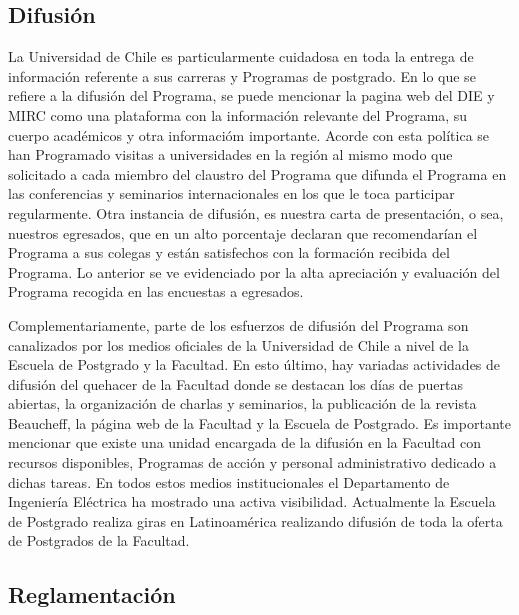\subsection{Difusión}

La Universidad de Chile es particularmente cuidadosa en toda la entrega de información referente
a sus carreras y Programas de postgrado. En lo que se refiere a la difusión del Programa, se puede
mencionar la pagina web del DIE y MIRC como una plataforma con la información relevante del
Programa, su cuerpo académicos y otra informacióm importante. 
Acorde con esta política se han Programado visitas a universidades en la región al mismo modo que
solicitado a cada miembro del claustro del Programa que difunda el Programa en las conferencias y
seminarios internacionales en los que le toca participar regularmente. Otra instancia de difusión, es nuestra 
carta de presentación, o sea, nuestros egresados, que en un alto porcentaje declaran que recomendarían
el Programa a sus colegas y están satisfechos con la formación recibida del Programa.
Lo anterior se ve evidenciado por la alta apreciación y evaluación del Programa recogida en las
encuestas a egresados. %

Complementariamente, parte de los esfuerzos de difusión del Programa son canalizados por
los medios oficiales de la Universidad de Chile a nivel de la Escuela de Postgrado y la Facultad.
En esto último, hay variadas actividades de difusión del quehacer de la Facultad donde se destacan
los días de puertas abiertas, la organización de charlas y seminarios, la publicación de la revista
Beaucheff, la página web de la Facultad y la Escuela de Postgrado. Es importante mencionar que
existe una unidad encargada de la difusión en la Facultad con recursos disponibles, Programas de
acción y personal administrativo dedicado a dichas tareas. En todos estos medios institucionales el
Departamento de Ingeniería Eléctrica ha mostrado una activa visibilidad. Actualmente la Escuela
de Postgrado realiza giras en Latinoamérica realizando difusión de toda la oferta de Postgrados de
la Facultad.

\subsection{Reglamentación}

